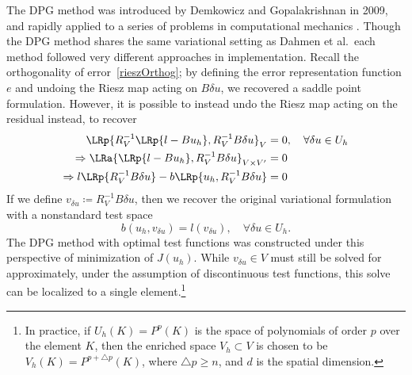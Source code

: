 The DPG method was introduced by Demkowicz and Gopalakrishnan in 2009, and rapidly applied to a series of problems in computational mechanics \cite{DPG2,DPG3,DPG4,maxwellDPG,stokesDPG}.  Though the DPG method shares the same variational setting as Dahmen et al.\, each method followed very different approaches in implementation.  Recall the orthogonality of error~\eqref{rieszOrthog}; by defining the error representation function $e$ and undoing the Riesz map acting on $B\delta u$, we recovered a saddle point formulation.  However, it is possible to instead undo the Riesz map acting on the residual instead, to recover
\begin{align*}
\LRp{R_V^{-1}\LRp{l-Bu_h},R_V^{-1}B\delta u}_V &= 0, \quad \forall \delta u \in U_h\\
\Rightarrow \LRa{\LRp{l-Bu_h},R_V^{-1}B\delta u}_{V\times V'} &= 0\\
\Rightarrow l\LRp{R_V^{-1}B\delta u}-b\LRp{u_h,R_V^{-1}B\delta u} &= 0
\end{align*}
If we define $v_{\delta u} \coloneqq R_V^{-1}B\delta u$, then we recover the original variational formulation with a nonstandard test space
\[
b(u_h,v_{\delta u}) = l(v_{\delta u}), \quad \forall \delta u \in U_h.
\]
The DPG method with optimal test functions was constructed under this perspective of minimization of $J(u_h)$.  While $v_{\delta u} \in V$ must still be solved for approximately, under the assumption of discontinuous test functions, this solve can be localized to a single element.\footnote{In practice, if $U_h(K) = P^p(K)$ is the space of polynomials of order $p$ over the element $K$, then the enriched space $V_h \subset V$ is chosen to be $V_h(K) = P^{p+\triangle p}(K)$, where $\triangle p \geq n$, and $d$ is the spatial dimension.}

